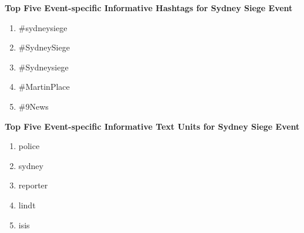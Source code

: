 \textbf{Top Five Event-specific Informative Hashtags for Sydney Siege Event}
\begin{enumerate}
\item \#sydneysiege 
\item \#SydneySiege
\item \#Sydneysiege
\item \#MartinPlace
\item \#9News                                                                                                                                                                                                                                                                                                                                                                                                                                                                                                                 
\end{enumerate}

\textbf{Top Five Event-specific Informative Text Units for Sydney Siege Event}
\begin{enumerate}
\item police
\item sydney
\item reporter
\item lindt
\item isis                                                                                                                                                                                                                                                                                                                                                                                                                                                                                                                
\end{enumerate}

